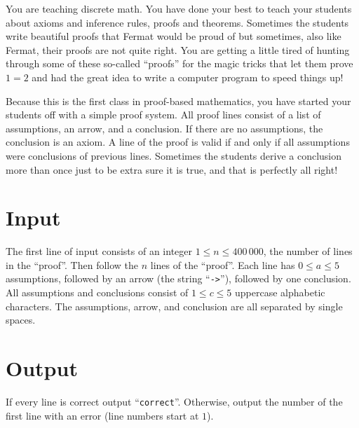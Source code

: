 
\noindent
You are teaching discrete math. You have done your best to teach your
students about axioms and inference rules, proofs and theorems.
Sometimes the students write beautiful proofs that Fermat would be
proud of but sometimes, also like Fermat, their proofs are not quite
right. You are getting a little tired of hunting through some of
these so-called ``proofs'' for the magic tricks that let them prove
$1 = 2$ and had the great idea to write a computer program to speed
things up!

Because this is the first class in proof-based mathematics, you have
started your students off with a simple proof system. All proof lines
consist of a list of assumptions, an arrow, and a conclusion. If
there are no assumptions, the conclusion is an axiom. A line of the
proof is valid if and only if all assumptions were conclusions of
previous lines. Sometimes the students derive a conclusion more than
once just to be extra sure it is true, and that is perfectly all right!

\section*{Input}

The first line of input consists of an integer $1 \le n \le 400\,000$,
the number of lines in the ``proof''. Then follow the $n$ lines of
the ``proof''. Each line has $0 \le a
\le 5$ assumptions, followed by an arrow (the string ``\texttt{->}''), followed by one
conclusion. All assumptions and
conclusions consist of $1 \le c \le 5$ uppercase alphabetic
characters. The assumptions, arrow, and conclusion are all
separated by single spaces.

\section*{Output}

If every line is correct output ``\texttt{correct}''.  Otherwise, output
the number of the first line with an error (line numbers start at
$1$).
